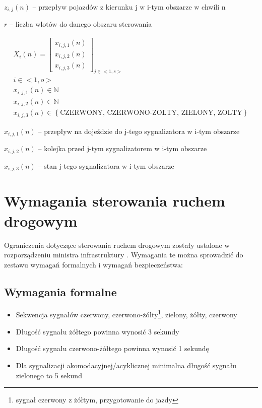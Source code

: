 \begin{math} z_{i,j} (n) \end{math} \textrm{ -- przepływ pojazdów z kierunku j w i-tym obszarze w chwili n}

\begin{math} r \end{math} -- liczba wlotów do danego obszaru sterowania

\begin{equation}
	\begin{array}{c}
		X_i (n) = \left[
			\begin{array}{c}
				x_{i, j, 1} (n) \\ x_{i, j, 2} (n) \\ x_{i, j, 3} (n)
			\end{array}
		\right]_{j \in <1,s>}\\
		i \in <1,o>\\
		x_{i, j, 1} (n) \in \mathbb{N}\\
		x_{i, j, 2} (n) \in \mathbb{N}\\
		x_{i, j, 3} (n) \in \left\{ \textrm{CZERWONY, CZERWONO-ZOLTY, ZIELONY, ZOLTY} \right\}
	\end{array}
\end{equation}

\begin{math} x_{i, j, 1} (n) \end{math} \textrm{ -- przepływ na dojeździe do j-tego sygnalizatora w i-tym obszarze}

\begin{math} x_{i, j, 2} (n) \end{math} \textrm{ -- kolejka przed j-tym sygnalizatorem w i-tym obszarze}

\begin{math} x_{i, j, 3} (n) \end{math} \textrm{ -- stan j-tego sygnalizatora w i-tym obszarze}

\section{Wymagania sterowania ruchem drogowym}
\label{sec:model_ograniczenia}
Ograniczenia dotyczące sterowania ruchem drogowym zostały ustalone w rozporządzeniu ministra infrastruktury \cite{rozporzadzenie}. Wymagania te można sprowadzić do zestawu wymagań formalnych i wymagań bezpieczeństwa:
\subsection{Wymagania formalne}
\begin{itemize}
	\item Sekwencja sygnałów czerwony, czerwono-żółty\footnote{sygnał czerwony z żółtym, przygotowanie do jazdy}, zielony, żółty, czerwony
	\item Długość sygnału żółtego powinna wynosić 3 sekundy
	\item Długość sygnału czerwono-żółtego powinna wynosić 1 sekundę
	\item Dla sygnalizacji akomodacyjnej/acyklicznej minimalna długość sygnału zielonego to 5 sekund
\end{itemize}

